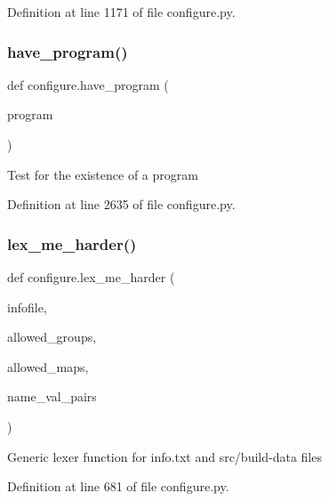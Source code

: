 Definition at line 1171 of file configure.\+py.

\mbox{\label{namespaceconfigure_aa1eef29d33186b94c9bc48c12630b61c}} 
\subsubsection{\texorpdfstring{have\+\_\+program()}{have\_program()}}
{\footnotesize\ttfamily def configure.\+have\+\_\+program (\begin{DoxyParamCaption}\item[{}]{program }\end{DoxyParamCaption})}

\begin{DoxyVerb}Test for the existence of a program
\end{DoxyVerb}
 

Definition at line 2635 of file configure.\+py.

\mbox{\label{namespaceconfigure_a177450ea125f9515fbb3e23b1cfb298f}} 
\subsubsection{\texorpdfstring{lex\+\_\+me\+\_\+harder()}{lex\_me\_harder()}}
{\footnotesize\ttfamily def configure.\+lex\+\_\+me\+\_\+harder (\begin{DoxyParamCaption}\item[{}]{infofile,  }\item[{}]{allowed\+\_\+groups,  }\item[{}]{allowed\+\_\+maps,  }\item[{}]{name\+\_\+val\+\_\+pairs }\end{DoxyParamCaption})}

\begin{DoxyVerb}Generic lexer function for info.txt and src/build-data files
\end{DoxyVerb}
 

Definition at line 681 of file configure.\+py.

\mbox{\label{namespaceconfigure_ad3538577a74695d9c40c43c753652f99}} 
